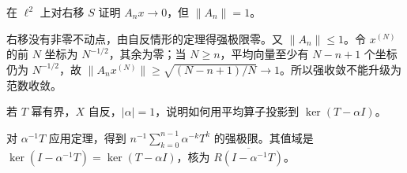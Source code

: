 \begin{exercise}[收敛未必一致]\label{ex:y8-ergodic-norm}
在 $\ell^2$ 上对右移 $S$ 证明 $A_nx\to0$，但 $\|A_n\|=1$。
\end{exercise}
\begin{solution}
右移没有非零不动点，由自反情形的定理得强极限零。又 $\|A_n\|\le1$。令 $x^{(N)}$ 的前 $N$ 坐标为 $N^{-1/2}$，其余为零；当 $N\ge n$，平均向量至少有 $N-n+1$ 个坐标仍为 $N^{-1/2}$，故 $\|A_nx^{(N)}\|\ge\sqrt{(N-n+1)/N}\to1$。所以强收敛不能升级为范数收敛。
\end{solution}

\begin{exercise}[提取其他特征值]\label{ex:y8-twisted-mean}
若 $T$ 幂有界，$X$ 自反，$|\alpha|=1$，说明如何用平均算子投影到 $\ker(T-\alpha I)$。
\end{exercise}
\begin{solution}
对 $\alpha^{-1}T$ 应用定理，得到 $n^{-1}\sum_{k=0}^{n-1}\alpha^{-k}T^k$ 的强极限。其值域是 $\ker(I-\alpha^{-1}T)=\ker(T-\alpha I)$，核为 $\overline{R(I-\alpha^{-1}T)}$。
\end{solution}
